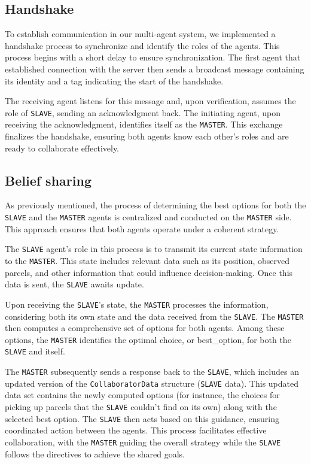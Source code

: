 \documentclass[10pt]{article}
\begin{document}
\subsection{Handshake}

To establish communication in our multi-agent system, we implemented a handshake process to synchronize and identify the roles of the agents. This process begins with a short delay to ensure synchronization. The first agent that established connection with the server then sends a broadcast message containing its identity and a tag indicating the start of the handshake.

The receiving agent listens for this message and, upon verification, assumes the role of \texttt{SLAVE}, sending an acknowledgment back. The initiating agent, upon receiving the acknowledgment, identifies itself as the \texttt{MASTER}. This exchange finalizes the handshake, ensuring both agents know each other's roles and are ready to collaborate effectively. 

\subsection{Belief sharing}
\label{belief}

As previously mentioned, the process of determining the best options for both the \texttt{SLAVE} and the \texttt{MASTER} agents is centralized and conducted on the \texttt{MASTER} side. This approach ensures that both agents operate under a coherent strategy.

The \texttt{SLAVE} agent's role in this process is to transmit its current state information to the \texttt{MASTER}. This state includes relevant data such as its position, observed parcels, and other information that could influence decision-making. Once this data is sent, the \texttt{SLAVE} awaits update.

Upon receiving the \texttt{SLAVE}'s state, the \texttt{MASTER} processes the information, considering both its own state and the data received from the \texttt{SLAVE}. The \texttt{MASTER} then computes a comprehensive set of options for both agents. Among these options, the \texttt{MASTER} identifies the optimal choice, or best\_option, for both the \texttt{SLAVE} and itself.

The \texttt{MASTER} subsequently sends a response back to the \texttt{SLAVE}, which includes an updated version of the \texttt{CollaboratorData} structure (\texttt{SLAVE} data). This updated data set contains the newly computed options (for instance, the choices for picking up parcels that the \texttt{SLAVE} couldn't find on its own) along with the selected best option. The \texttt{SLAVE} then acts based on this guidance, ensuring coordinated action between the agents. This process facilitates effective collaboration, with the \texttt{MASTER} guiding the overall strategy while the \texttt{SLAVE} follows the directives to achieve the shared goals.
\end{document}

